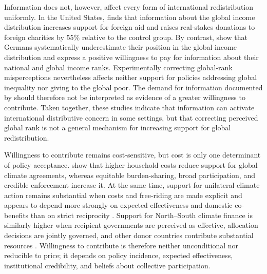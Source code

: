 \documentclass[11pt,a4paper]{article}
\begin{document}
Information does not, however, affect every form of international redistribution uniformly. In the United States, \citet{nair_misperceptions_2018} finds that information about the global income distribution increases support for foreign aid and raises real-stakes donations to foreign charities by 55\% relative to the control group. By contrast, \citet{fehr_your_2019} show that Germans systematically underestimate their position in the global income distribution and express a positive willingness to pay for information about their national and global income ranks. Experimentally correcting global-rank misperceptions nevertheless affects neither support for policies addressing global inequality nor giving to the global poor. The demand for information documented by \citet{fehr_your_2019} should therefore not be interpreted as evidence of a greater willingness to contribute. Taken together, these studies indicate that information can activate international distributive concern in some settings, but that correcting perceived global rank is not a general mechanism for increasing support for global redistribution.

Willingness to contribute remains cost-sensitive, but cost is only one determinant of policy acceptance. \citet{bechtel_mass_2013} show that higher household costs reduce support for global climate agreements, whereas equitable burden-sharing, broad participation, and credible enforcement increase it. %
At the same time, support for unilateral climate action remains substantial when costs and free-riding are made explicit and appears to depend more strongly on expected effectiveness and domestic co-benefits than on strict reciprocity \citep{bernauer_how_2015,mcgrath_how_2017}. %
Support for North--South climate finance is similarly higher when recipient governments are perceived as effective, allocation decisions are jointly governed, and other donor countries contribute substantial resources \citep{gampfer_obtaining_2014}. Willingness to contribute is therefore neither unconditional nor reducible to price; it depends on policy incidence, expected effectiveness, institutional credibility, and beliefs about collective participation.
\end{document}
